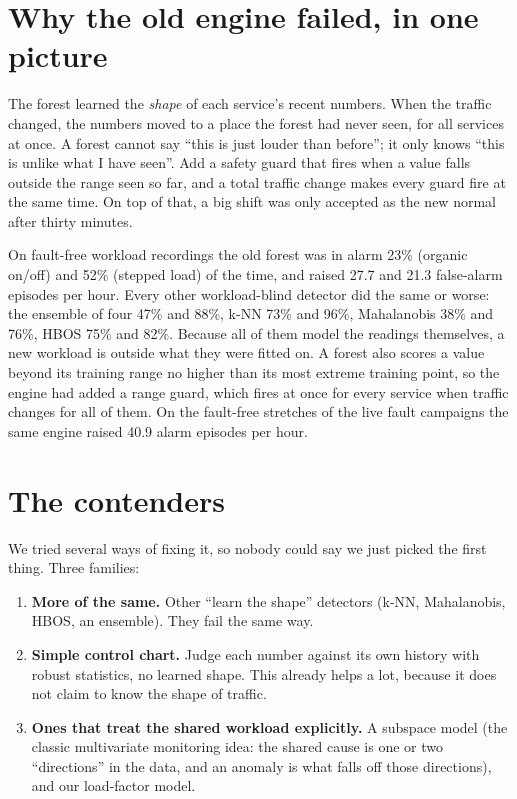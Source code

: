 \section{Why the old engine failed, in one picture}
\begin{simplebox}
The forest learned the \emph{shape} of each service's recent numbers. When the traffic changed, the numbers moved to a place the forest had never seen, for all services at once. A forest cannot say ``this is just louder than before''; it only knows ``this is unlike what I have seen''. Add a safety guard that fires when a value falls outside the range seen so far, and a total traffic change makes every guard fire at the same time. On top of that, a big shift was only accepted as the new normal after thirty minutes.
\end{simplebox}

\begin{techbox}
On fault-free workload recordings the old forest was in alarm 23\% (organic on/off) and 52\% (stepped load) of the time, and raised 27.7 and 21.3 false-alarm episodes per hour. Every other workload-blind detector did the same or worse: the ensemble of four 47\% and 88\%, k-NN 73\% and 96\%, Mahalanobis 38\% and 76\%, HBOS 75\% and 82\%. Because all of them model the readings themselves, a new workload is outside what they were fitted on. A forest also scores a value beyond its training range no higher than its most extreme training point, so the engine had added a range guard, which fires at once for every service when traffic changes for all of them. On the fault-free stretches of the live fault campaigns the same engine raised 40.9 alarm episodes per hour.
\end{techbox}

\section{The contenders}
\begin{simplebox}
We tried several ways of fixing it, so nobody could say we just picked the first thing. Three families:

\begin{enumerate}
\item \textbf{More of the same.} Other ``learn the shape'' detectors (k-NN, Mahalanobis, HBOS, an ensemble). They fail the same way.
\item \textbf{Simple control chart.} Judge each number against its own history with robust statistics, no learned shape. This already helps a lot, because it does not claim to know the shape of traffic.
\item \textbf{Ones that treat the shared workload explicitly.} A subspace model (the classic multivariate monitoring idea: the shared cause is one or two ``directions'' in the data, and an anomaly is what falls off those directions), and our load-factor model.
\end{enumerate}
\end{simplebox}

